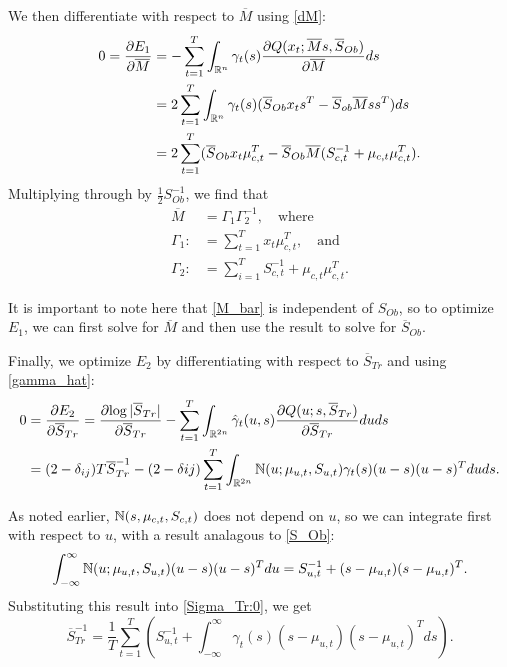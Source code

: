 \documentclass[12pt,leqno]{article}
\begin{document}
We then differentiate with respect to $\overline{M}$ using \eqref{dM}:
\begin{align*}
  0 = \frac{\partial{E_1}}{\partial{\overline{M}}} &=
  - \sum_{t=1}^T\int_{{\mathbb R}^n}\gamma_t(s)\frac{\partial{Q(x_t;\overline{M}s,\overline{S}_{Ob})}}{\partial{\overline{M}}}ds \\
  &= 2\sum_{t=1}^T\int_{{\mathbb R}^n}\gamma_t(s)(\overline{S}_{Ob}x_ts^T - \overline{S}_{ob}\overline{M}ss^T)ds \\
  &= 2\sum_{t=1}^T(\overline{S}_{Ob}x_t\mu_{c,t}^T - \overline{S}_{Ob}\overline{M}(S_{c,t}^{-1} + \mu_{c,t}\mu_{c,t}^T).
\end{align*}
Multiplying through by $\frac{1}{2}S_{Ob}^{-1}$, we find that
\begin{equation}\label{M_bar}
  \begin{split}
    \overline{M} &= \Gamma_1\Gamma_2^{-1}, \quad\text{where}\\
    \Gamma_1 :&= \sum_{t=1}^Tx_t\mu_{c,t}^T, \quad\text{and}\\
    \Gamma_2 :&= \sum_{i=1}^TS_{c,t}^{-1} + \mu_{c,t}\mu_{c,t}^T.
  \end{split}
\end{equation}

It is important to note here that \eqref{M_bar} is independent of $S_{Ob}$, so to optimize $E_1$, we can first
solve for $\overline{M}$ and then use the result to solve for $\overline{S}_{Ob}$.  

Finally, we optimize $E_2$ by differentiating with respect to $\overline{S}_{Tr}$ and using \eqref{gamma_hat}:
\begin{equation}\label{Sigma_Tr:0}
  \begin{split}
  0 &= \frac{\partial{E_2}}{\partial{\overline{S}_{Tr}}} = \frac{\partial{\log|\overline{S}_{Tr}|}}{\partial\overline{S}_{Tr}}
  - \sum_{t=1}^T\int_{{\mathbb R}^{2n}}\hat{\gamma}_t(u,s)\frac{\partial{Q(u;s,\overline{S}_{Tr})}}{\partial\overline{S}_{Tr}}duds \\
      &= (2-\delta_{ij})T\overline{S}_{Tr}^{-1} - (2-\delta{ij}) \sum_{t=1}^T\int_{{\mathbb R}^{2n}}{\mathbb N}(u;\mu_{u,t},S_{u,t})\gamma_t(s)(u-s)(u-s)^Tduds.
  \end{split}
\end{equation}

As noted earlier, ${\mathbb N}(s,\mu_{c,t},S_{c,t})$ does not depend on $u$, so we can integrate first with respect to $u$, with a result
analagous to \eqref{S_Ob}:
$$
  \int_{-\infty}^{\infty}{\mathbb N}(u;\mu_{u,t},S_{u,t})(u-s)(u-s)^Tdu = S_{u,t}^{-1} + (s-\mu_{u,t})(s-\mu_{u,t})^T.
$$
Substituting this result into \eqref{Sigma_Tr:0}, we get
\begin{equation}\label{Sigma_Tr:1}
  \overline{S}_{Tr}^{-1} =  \frac{1}{T}\sum_{t=1}^T\left(S_{u,t}^{-1} +\int_{-\infty}^{\infty}\gamma_t(s)
  (s-\mu_{u,t})(s-\mu_{u,t})^Tds\right).
\end{equation}
\end{document}
